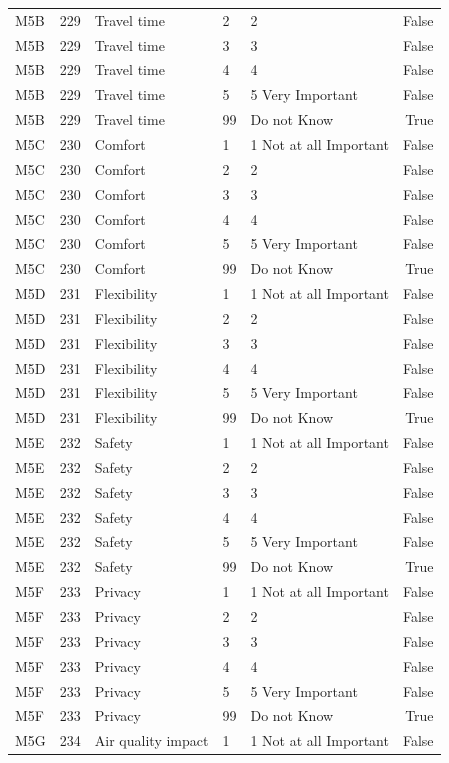 \begin{tabular}{lrlllr}
M5B & 229 & Travel time & 2 & 2 & False \\
M5B & 229 & Travel time & 3 & 3 & False \\
M5B & 229 & Travel time & 4 & 4 & False \\
M5B & 229 & Travel time & 5 & 5 Very Important & False \\
M5B & 229 & Travel time & 99 & Do not Know & True \\
M5C & 230 & Comfort & 1 & 1 Not at all Important & False \\
M5C & 230 & Comfort & 2 & 2 & False \\
M5C & 230 & Comfort & 3 & 3 & False \\
M5C & 230 & Comfort & 4 & 4 & False \\
M5C & 230 & Comfort & 5 & 5 Very Important & False \\
M5C & 230 & Comfort & 99 & Do not Know & True \\
M5D & 231 & Flexibility & 1 & 1 Not at all Important & False \\
M5D & 231 & Flexibility & 2 & 2 & False \\
M5D & 231 & Flexibility & 3 & 3 & False \\
M5D & 231 & Flexibility & 4 & 4 & False \\
M5D & 231 & Flexibility & 5 & 5 Very Important & False \\
M5D & 231 & Flexibility & 99 & Do not Know & True \\
M5E & 232 & Safety & 1 & 1 Not at all Important & False \\
M5E & 232 & Safety & 2 & 2 & False \\
M5E & 232 & Safety & 3 & 3 & False \\
M5E & 232 & Safety & 4 & 4 & False \\
M5E & 232 & Safety & 5 & 5 Very Important & False \\
M5E & 232 & Safety & 99 & Do not Know & True \\
M5F & 233 & Privacy & 1 & 1 Not at all Important & False \\
M5F & 233 & Privacy & 2 & 2 & False \\
M5F & 233 & Privacy & 3 & 3 & False \\
M5F & 233 & Privacy & 4 & 4 & False \\
M5F & 233 & Privacy & 5 & 5 Very Important & False \\
M5F & 233 & Privacy & 99 & Do not Know & True \\
M5G & 234 & Air quality impact & 1 & 1 Not at all Important & False \\

\end{tabular}
